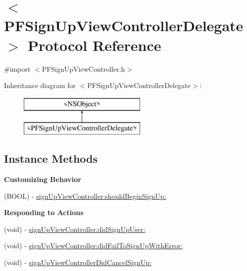 \hypertarget{protocol_p_f_sign_up_view_controller_delegate-p}{}\section{$<$P\+F\+Sign\+Up\+View\+Controller\+Delegate$>$ Protocol Reference}
\label{protocol_p_f_sign_up_view_controller_delegate-p}


{\ttfamily \#import $<$P\+F\+Sign\+Up\+View\+Controller.\+h$>$}

Inheritance diagram for $<$P\+F\+Sign\+Up\+View\+Controller\+Delegate$>$\+:\begin{figure}[H]
\begin{center}
\leavevmode
\includegraphics[height=2.000000cm]{protocol_p_f_sign_up_view_controller_delegate-p}
\end{center}
\end{figure}
\subsection*{Instance Methods}
\begin{Indent}{\bf Customizing Behavior}\par
{\em 

 

 }\begin{DoxyCompactItemize}
\item 
(B\+O\+O\+L) -\/ \hyperlink{protocol_p_f_sign_up_view_controller_delegate-p_a86a7428d0dfbf0baf7bca3360334ff0a}{sign\+Up\+View\+Controller\+:should\+Begin\+Sign\+Up\+:}
\end{DoxyCompactItemize}
\end{Indent}
\begin{Indent}{\bf Responding to Actions}\par
{\em 

 

 }\begin{DoxyCompactItemize}
\item 
(void) -\/ \hyperlink{protocol_p_f_sign_up_view_controller_delegate-p_a0722edf19ebc03788c69506b72e914df}{sign\+Up\+View\+Controller\+:did\+Sign\+Up\+User\+:}
\item 
(void) -\/ \hyperlink{protocol_p_f_sign_up_view_controller_delegate-p_ab4e689a75136afa74a78403c30e27ece}{sign\+Up\+View\+Controller\+:did\+Fail\+To\+Sign\+Up\+With\+Error\+:}
\item 
(void) -\/ \hyperlink{protocol_p_f_sign_up_view_controller_delegate-p_a1e14dd2a7a22f72edd204529a6d6967a}{sign\+Up\+View\+Controller\+Did\+Cancel\+Sign\+Up\+:}
\end{DoxyCompactItemize}
\end{Indent}


